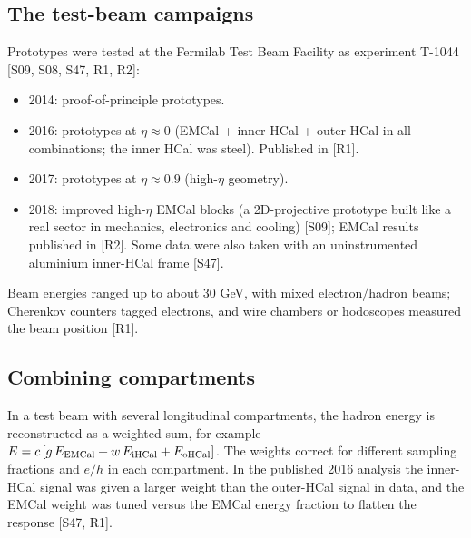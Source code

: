\documentclass[11pt,letterpaper]{article}
\begin{document}
\subsection{The test-beam campaigns}
Prototypes were tested at the Fermilab Test Beam Facility as experiment T-1044 [S09, S08, S47, R1, R2]:
\begin{itemize}
\item 2014: proof-of-principle prototypes.
\item 2016: prototypes at $\eta\approx0$ (EMCal + inner HCal + outer HCal in all combinations; the inner HCal was steel). Published in [R1].
\item 2017: prototypes at $\eta\approx0.9$ (high-$\eta$ geometry).
\item 2018: improved high-$\eta$ EMCal blocks (a 2D-projective prototype built like a real sector in mechanics, electronics and cooling) [S09]; EMCal results published in [R2]. Some data were also taken with an uninstrumented aluminium inner-HCal frame [S47].
\end{itemize}
Beam energies ranged up to about 30 GeV, with mixed electron/hadron beams; Cherenkov counters tagged electrons, and wire chambers or hodoscopes measured the beam position [R1].

\subsection{Combining compartments}
In a test beam with several longitudinal compartments, the hadron energy is reconstructed as a weighted sum, for example $E=c\,[g\,E_{\rm EMCal}+w\,E_{\rm iHCal}+E_{\rm oHCal}]$.
The weights correct for different sampling fractions and $e/h$ in each compartment.
In the published 2016 analysis the inner-HCal signal was given a larger weight than the outer-HCal signal in data, and the EMCal weight was tuned versus the EMCal energy fraction to flatten the response [S47, R1].
\end{document}
